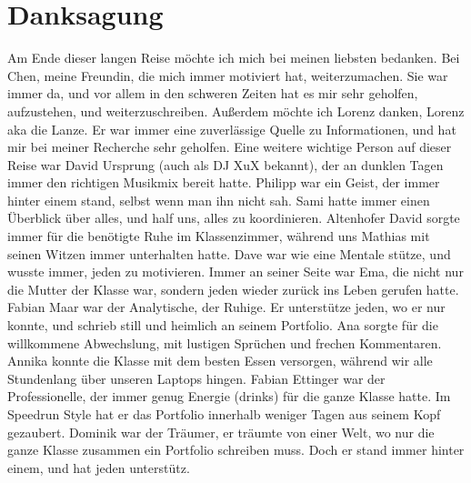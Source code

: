 \section{Danksagung}
Am Ende dieser langen Reise möchte ich mich bei meinen liebsten bedanken. Bei Chen, meine Freundin, die mich immer motiviert hat, weiterzumachen. Sie war immer da, und vor allem in den schweren Zeiten hat es mir sehr geholfen, aufzustehen, und weiterzuschreiben. Außerdem möchte ich Lorenz danken, Lorenz aka die Lanze. Er war immer eine zuverlässige Quelle zu Informationen, und hat mir bei meiner Recherche sehr geholfen. Eine weitere wichtige Person auf dieser Reise war David Ursprung (auch als DJ XuX bekannt), der an dunklen Tagen immer den richtigen Musikmix bereit hatte. Philipp war ein Geist, der immer hinter einem stand, selbst wenn man ihn nicht sah. Sami hatte immer einen Überblick über alles, und half uns, alles zu koordinieren. Altenhofer David sorgte immer für die benötigte Ruhe im Klassenzimmer, während uns Mathias mit seinen Witzen immer unterhalten hatte. Dave war wie eine Mentale stütze, und wusste immer, jeden zu motivieren. Immer an seiner Seite war Ema, die nicht nur die Mutter der Klasse war, sondern jeden wieder zurück ins Leben gerufen hatte. Fabian Maar war der Analytische, der Ruhige. Er unterstütze jeden, wo er nur konnte, und schrieb still und heimlich an seinem Portfolio. Ana sorgte für die willkommene Abwechslung, mit lustigen Sprüchen und frechen Kommentaren. Annika konnte die Klasse mit dem besten Essen versorgen, während wir alle Stundenlang über unseren Laptops hingen.  Fabian Ettinger war der Professionelle, der immer genug Energie (drinks) für die ganze Klasse hatte. Im Speedrun Style hat er das Portfolio innerhalb weniger Tagen aus seinem Kopf gezaubert. Dominik war der Träumer, er träumte von einer Welt, wo nur die ganze Klasse zusammen ein Portfolio schreiben muss. Doch er stand immer hinter einem, und hat jeden unterstütz.  

 

